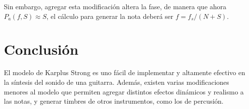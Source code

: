 Sin embargo, agregar esta modificación altera la fase, de manera que ahora $P_a(f,S) \approx S$, el cálculo para generar la nota deberá ser $f = f_s / (N+S)$.

\section{Conclusión}
El modelo de Karplus Strong es uno fácil de implementar y altamente efectivo en la síntesis del sonido de una guitarra. Además, existen varias modificaciones menores al modelo que permiten agregar distintos efectos dinámicos y realismo a las notas, y generar timbres de otros instrumentos, como los de percusión.
